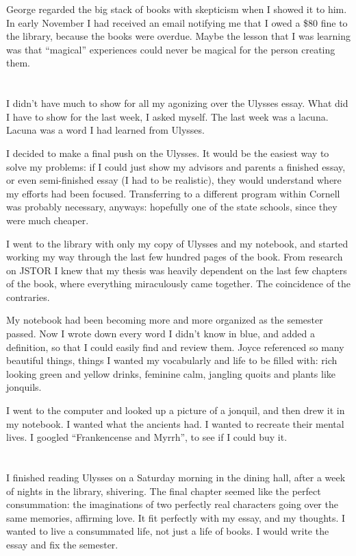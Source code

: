 George regarded the big stack of books with skepticism when I showed it to him.
In early November I had received an email notifying me that I owed a \$80 fine
to the library, because the books were overdue.  Maybe the lesson that I was
learning was that ``magical'' experiences could never be magical for the person
creating them.

\section{}

I didn't have much to show for all my agonizing over the Ulysses essay.  What
did I have to show for the last week, I asked myself.  The last week was a
lacuna.  Lacuna was a word I had learned from Ulysses.  

I decided to make a final push on the Ulysses.  It would be the easiest way to
solve my problems: if I could just show my advisors and parents a finished
essay, or even semi-finished essay (I had to be realistic), they would
understand where my efforts had been focused.  Transferring to a different
program within Cornell was probably necessary, anyways: hopefully one of the
state schools, since they were much cheaper.

I went to the library with only my copy of Ulysses and my notebook, and started
working my way through the last few hundred pages of the book.  From research on
JSTOR I knew that my thesis was heavily dependent on the last few chapters of
the book, where everything miraculously came together.  The coincidence of the
contraries.

My notebook had been becoming more and more organized as the semester passed.
Now I wrote down every word I didn't know in blue, and added a definition, so
that I could easily find and review them.  Joyce referenced so many beautiful
things, things I wanted my vocabularly and life to be filled with: rich looking
green and yellow drinks, feminine calm, jangling quoits and plants like
jonquils.  

I went to the computer and looked up a picture of a jonquil, and then drew it in
my notebook.  I wanted what the ancients had.  I wanted to recreate their mental
lives.  I googled ``Frankencense and Myrrh'', to see if I could buy it.

\section{}

I finished reading Ulysses on a Saturday morning in the dining hall, after a
week of nights in the library, shivering.  The final chapter seemed like the
perfect consummation: the imaginations of two perfectly real characters going
over the same memories, affirming love.  It fit perfectly with my essay, and my
thoughts.  I wanted to live a consummated life, not just a life of books.  I
would write the essay and fix the semester.

